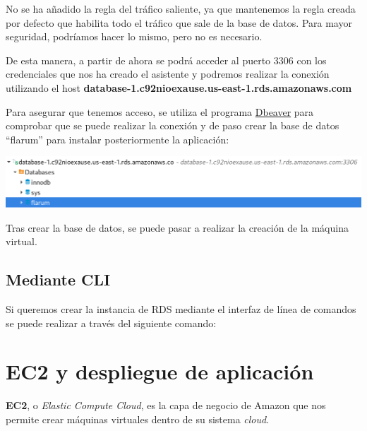 \documentclass{\ClassPath/viu-tfm-template}
\begin{document}
No se ha añadido la regla del tráfico saliente, ya que mantenemos la regla creada por defecto que habilita todo el tráfico que sale de la base de datos. Para mayor seguridad, podríamos hacer lo mismo, pero no es necesario.


De esta manera, a partir de ahora se podrá acceder al puerto 3306 con los credenciales que nos ha creado el asistente y podremos realizar la conexión utilizando el host \textbf{database-1.c92nioexause.us-east-1.rds.amazonaws.com}

Para asegurar que tenemos acceso, se utiliza el programa \href{https://dbeaver.io/}{Dbeaver} para comprobar que se puede realizar la conexión y de paso crear la base de datos “flarum” para instalar posteriormente la aplicación:

\begin{center}
    \includegraphics[frame,width=\linewidth]{img/db6.png}
\end{center}

Tras crear la base de datos, se puede pasar a realizar la creación de la máquina virtual.


\section{Mediante CLI}
Si queremos crear la instancia de RDS mediante el interfaz de línea de comandos se puede realizar a través del siguiente comando:



\chapter{EC2 y despliegue de aplicación}
\textbf{EC2}, o \textit{Elastic Compute Cloud}, es la capa de negocio de Amazon que nos permite crear máquinas virtuales dentro de su sistema \textit{cloud}.
\end{document}
